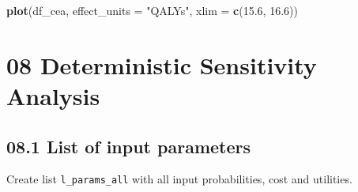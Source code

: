 \documentclass[
]{article}
\newenvironment{Shaded}{\begin{snugshade}}{\end{snugshade}}
\newcommand{\DataTypeTok}[1]{\textcolor[rgb]{0.13,0.29,0.53}{#1}}
\newcommand{\FloatTok}[1]{\textcolor[rgb]{0.00,0.00,0.81}{#1}}
\newcommand{\KeywordTok}[1]{\textcolor[rgb]{0.13,0.29,0.53}{\textbf{#1}}}
\newcommand{\NormalTok}[1]{#1}
\newcommand{\StringTok}[1]{\textcolor[rgb]{0.31,0.60,0.02}{#1}}
\begin{document}
\begin{Shaded}
\begin{Highlighting}[]
\KeywordTok{plot}\NormalTok{(df_cea, }\DataTypeTok{effect_units =} \StringTok{"QALYs"}\NormalTok{, }\DataTypeTok{xlim =} \KeywordTok{c}\NormalTok{(}\FloatTok{15.6}\NormalTok{, }\FloatTok{16.6}\NormalTok{))}
\end{Highlighting}
\end{Shaded}

\hypertarget{deterministic-sensitivity-analysis}{%
\section{08 Deterministic Sensitivity
Analysis}\label{deterministic-sensitivity-analysis}}

\hypertarget{list-of-input-parameters}{%
\subsection{08.1 List of input
parameters}\label{list-of-input-parameters}}

Create list \texttt{l\_params\_all} with all input probabilities, cost
and utilities.
\end{document}
